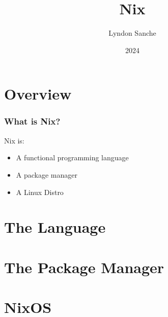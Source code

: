 \documentclass{beamer}
\title{Nix}
\author{Lyndon Sanche}
\date{2024}
\begin{document}
\frame{\titlepage}

\section{Overview}
\begin{frame}
    \frametitle{What is Nix?}
    Nix is:
    \begin{itemize}
        \item<1-> A functional programming language
        \item<2-> A package manager
        \item<3-> A Linux Distro
    \end{itemize}
\end{frame}

\section{The Language}

\section{The Package Manager}

\section{NixOS}
\end{document}
